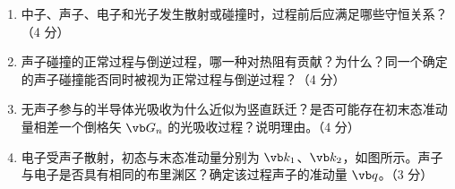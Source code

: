 \begin{question}[15 分]
\begin{enumerate}
  \item 中子、声子、电子和光子发生散射或碰撞时，过程前后应满足哪些守恒关系？（4 分）
  \item 声子碰撞的正常过程与倒逆过程，哪一种对热阻有贡献？为什么？同一个确定的声子碰撞能否同时被视为正常过程与倒逆过程？（4 分）
  \item 无声子参与的半导体光吸收为什么近似为竖直跃迁？是否可能存在初末态准动量相差一个倒格矢 $\vb G_n$ 的光吸收过程？说明理由。（4 分）
  \item 电子受声子散射，初态与末态准动量分别为 $\vb k_1$、$\vb k_2$，如图所示。声子与电子是否具有相同的布里渊区？确定该过程声子的准动量 $\vb q$。（3 分）
\end{enumerate}
\begin{center}
\end{center}



\end{question}

